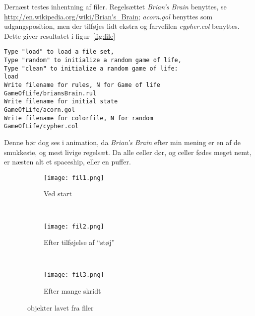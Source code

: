 Dernæst testes inhentning af filer. Regelsættet \emph{Brian's Brain} benyttes, se \url{http://en.wikipedia.org/wiki/Brian's_Brain};
\emph{acorn.gol} benyttes som udgangsposition, men der tilføjes lidt ekstra og farvefilen \emph{cypher.col} benyttes. Dette giver resultatet i figur~\ref{fig:file}
\begin{lstlisting}[caption=" Tilf\ae ldigt game of life p\aa 50x50"]
Type "load" to load a file set,
Type "random" to initialize a random game of life,
Type "clean" to initialize a random game of life:
load
Write filename for rules, N for Game of life
GameOfLife/briansBrain.rul
Write filename for initial state
GameOfLife/acorn.gol
Write filename for colorfile, N for random
GameOfLife/cypher.col
\end{lstlisting}
Denne bør dog ses i animation, da \emph{Brian's Brain} efter min mening er en af de smukkeste, og mest livige regelsæt.
Da alle celler dør, og celler fødes meget nemt, er næsten alt et spaceship, eller en puffer.

\begin{figure}
        \centering
        \begin{subfigure}[b]{0.3\textwidth}
                \centering
                \texttt{[image: fil1.png]}
                \caption{Ved start}
        \end{subfigure}%
        ~
        \begin{subfigure}[b]{0.3\textwidth}
                \centering
                \texttt{[image: fil2.png]}
                \caption{Efter tilføjelse af ``støj''}
        \end{subfigure}
        ~
        \begin{subfigure}[b]{0.3\textwidth}
                \centering
                \texttt{[image: fil3.png]}
                \caption{Efter mange skridt}
        \end{subfigure}
        \caption{\gol~objekter lavet fra filer}\label{fig:fil}
\end{figure}